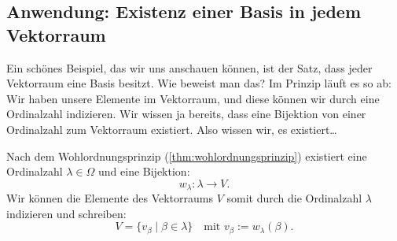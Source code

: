 \subsection{Anwendung: Existenz einer Basis in jedem Vektorraum}

\begin{spoken-clean}[00:38:05 - 00:39:55]
Ein schönes Beispiel, das wir uns anschauen können, ist der Satz, dass jeder Vektorraum eine Basis besitzt. Wie beweist man das? Im Prinzip läuft es so ab: Wir haben unsere Elemente im Vektorraum, und diese können wir durch eine Ordinalzahl indizieren. Wir wissen ja bereits, dass eine Bijektion von einer Ordinalzahl zum Vektorraum existiert. Also wissen wir, es existiert\dots
\end{spoken-clean}

\begin{math-stroke}
\end{math-stroke}

\begin{math-stroke}
Nach dem Wohlordnungsprinzip (\cref{thm:wohlordnungsprinzip}) existiert eine Ordinalzahl $\lambda \in \Omega$ und eine Bijektion:
\[
w_\lambda \colon \lambda \to V.
\]
Wir können die Elemente des Vektorraums $V$ somit durch die Ordinalzahl $\lambda$ indizieren und schreiben:
\[
V = \{v_\beta \mid \beta \in \lambda\} \quad \text{mit } v_\beta := w_\lambda(\beta).
\]
\end{math-stroke}


